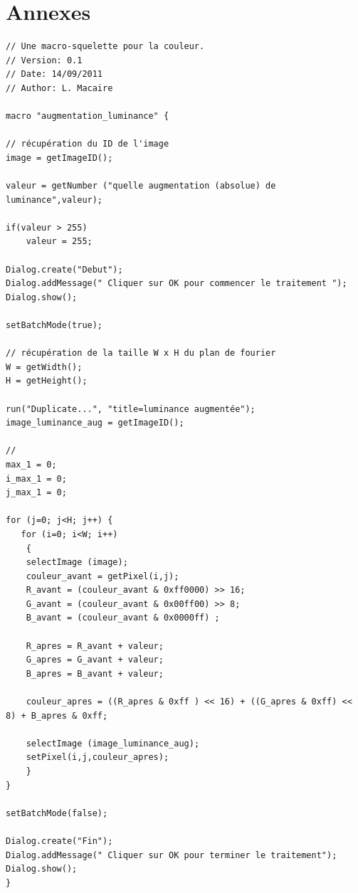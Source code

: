 \documentclass[a4paper,10pt]{article}
\begin{document}
\section{Annexes}
\begin{lstlisting}[caption=Macros de modification de la luminance d'une image]
// Une macro-squelette pour la couleur.
// Version: 0.1
// Date: 14/09/2011
// Author: L. Macaire
 
macro "augmentation_luminance" {

// récupération du ID de l'image
image = getImageID();

valeur = getNumber ("quelle augmentation (absolue) de luminance",valeur);

if(valeur > 255) 
    valeur = 255;

Dialog.create("Debut");
Dialog.addMessage(" Cliquer sur OK pour commencer le traitement ");
Dialog.show();

setBatchMode(true);

// récupération de la taille W x H du plan de fourier
W = getWidth();
H = getHeight();

run("Duplicate...", "title=luminance augmentée");
image_luminance_aug = getImageID();

// 
max_1 = 0; 
i_max_1 = 0;
j_max_1 = 0;

for (j=0; j<H; j++) {
   for (i=0; i<W; i++) 
	{
	selectImage (image);
	couleur_avant = getPixel(i,j);
	R_avant = (couleur_avant & 0xff0000) >> 16;
	G_avant = (couleur_avant & 0x00ff00) >> 8;
	B_avant = (couleur_avant & 0x0000ff) ;

	R_apres = R_avant + valeur;
	G_apres = G_avant + valeur;
	B_apres = B_avant + valeur;

	couleur_apres = ((R_apres & 0xff ) << 16) + ((G_apres & 0xff) << 8) + B_apres & 0xff;

	selectImage (image_luminance_aug);
	setPixel(i,j,couleur_apres);
	}
}

setBatchMode(false);

Dialog.create("Fin");
Dialog.addMessage(" Cliquer sur OK pour terminer le traitement");
Dialog.show();
}
\end{lstlisting}
\end{document}

